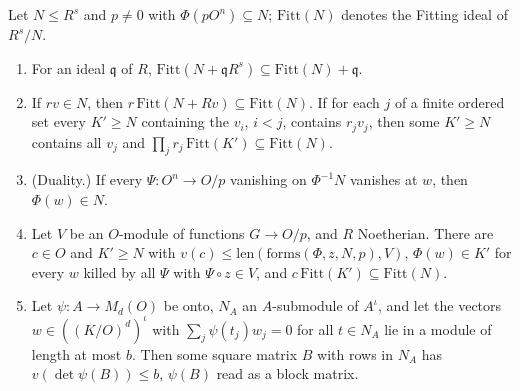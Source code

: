 \begin{lemma}\label{lem:fitting}
Let $N\le R^s$ and $p\ne0$ with $\Phi(pO^n)\subseteq N$; $\mathrm{Fitt}(N)$ denotes the Fitting ideal of $R^s/N$.
\begin{enumerate}[label=\textup{(\alph*)}]
\item For an ideal $\mathfrak q$ of $R$, $\mathrm{Fitt}(N+\mathfrak qR^s)\subseteq\mathrm{Fitt}(N)+\mathfrak q$.
\item If $rv\in N$, then $r\,\mathrm{Fitt}(N+Rv)\subseteq\mathrm{Fitt}(N)$. If for each $j$ of a finite ordered set every $K'\ge N$ containing the $v_i$, $i<j$, contains $r_jv_j$, then some $K'\ge N$ contains all $v_j$ and $\prod_jr_j\,\mathrm{Fitt}(K')\subseteq\mathrm{Fitt}(N)$.
\item (Duality.) If every $\Psi\colon O^n\to O/p$ vanishing on $\Phi^{-1}N$ vanishes at $w$, then $\Phi(w)\in N$.
\item Let $V$ be an $O$-module of functions $G\to O/p$, and $R$ Noetherian. There are $c\in O$ and $K'\ge N$ with $v(c)\le\mathrm{len}(\mathrm{forms}(\Phi,z,N,p),V)$, $\Phi(w)\in K'$ for every $w$ killed by all $\Psi$ with $\Psi\circ z\in V$,
and $c\,\mathrm{Fitt}(K')\subseteq\mathrm{Fitt}(N)$.
\item Let $\psi\colon A\to M_d(O)$ be onto, $N_A$ an $A$-submodule of $A^\iota$, and let the vectors $w\in((K/O)^d)^\iota$ with $\sum_j\psi(t_j)w_j=0$ for all $t\in N_A$ lie in a module of length at most $b$. Then some square matrix $B$ with rows in
$N_A$ has $v(\det\psi(B))\le b$, $\psi(B)$ read as a block matrix.
\end{enumerate}
\end{lemma}

